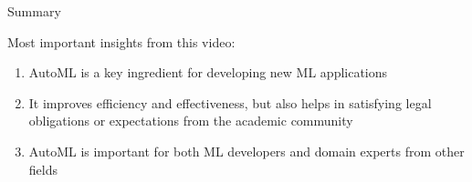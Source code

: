 \documentclass[main]{subfiles}
\begin{document}
\begin{frame}{Summary} 

Most important insights from this video:

\begin{enumerate}
    \item AutoML is a key ingredient for developing new ML applications
    \item It improves efficiency and effectiveness, but also helps in satisfying legal obligations or expectations from the academic community
    \item AutoML is important for both ML developers and domain experts from other fields
\end{enumerate}


\end{frame}
\end{document}
